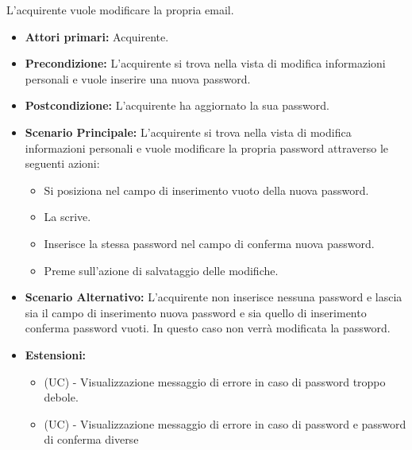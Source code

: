 L'acquirente vuole modificare la propria email.
\begin{itemize}
    \item \textbf{Attori primari:} Acquirente.
    \item \textbf{Precondizione:} L'acquirente si trova nella vista di modifica informazioni personali e vuole inserire una nuova password.
    \item \textbf{Postcondizione:} L'acquirente ha aggiornato la sua password.
    \item \textbf{Scenario Principale:} L'acquirente si trova nella vista di modifica informazioni personali e vuole modificare la propria password attraverso le seguenti azioni:
        \begin{itemize}
            \item Si posiziona nel campo di inserimento vuoto della nuova password.
            \item La scrive.
            \item Inserisce la stessa password nel campo di conferma nuova password.
            \item Preme sull'azione di salvataggio delle modifiche.
        \end{itemize}
    \item \textbf{Scenario Alternativo:} L'acquirente non inserisce nessuna password e lascia sia il campo di inserimento nuova password e sia quello di inserimento conferma password vuoti. In questo caso non verrà modificata la password.
    \item \textbf{Estensioni:}
    \begin{itemize}
        \item (UC) - Visualizzazione messaggio di errore in caso di password troppo debole.
        \item (UC) - Visualizzazione messaggio di errore in caso di password e password di conferma diverse
    \end{itemize}
\end{itemize}



